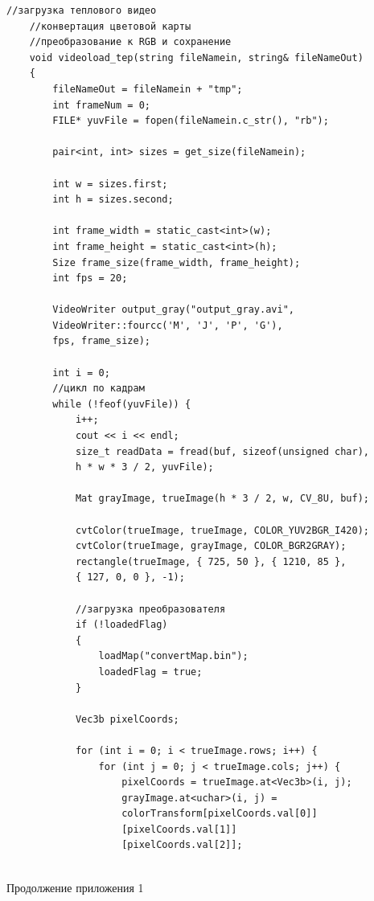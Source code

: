 \documentclass[14pt, a4paper]{extreport}
\begin{document}
\begin{Verbatim}[fontseries=c, fontsize=\fontsize{10pt}{12pt}\selectfont]
	//загрузка теплового видео
	//конвертация цветовой карты
	//преобразование к RGB и сохранение
	void videoload_tep(string fileNamein, string& fileNameOut)
	{
		fileNameOut = fileNamein + "tmp";
		int frameNum = 0;
		FILE* yuvFile = fopen(fileNamein.c_str(), "rb");
		
		pair<int, int> sizes = get_size(fileNamein);
		
		int w = sizes.first;
		int h = sizes.second;
		
		int frame_width = static_cast<int>(w);
		int frame_height = static_cast<int>(h);
		Size frame_size(frame_width, frame_height);
		int fps = 20;
		
		VideoWriter output_gray("output_gray.avi",
		VideoWriter::fourcc('M', 'J', 'P', 'G'),
		fps, frame_size);
		
		int i = 0;
		//цикл по кадрам
		while (!feof(yuvFile)) {
			i++;
			cout << i << endl;
			size_t readData = fread(buf, sizeof(unsigned char), 
			h * w * 3 / 2, yuvFile);
			
			Mat grayImage, trueImage(h * 3 / 2, w, CV_8U, buf);
			
			cvtColor(trueImage, trueImage, COLOR_YUV2BGR_I420);
			cvtColor(trueImage, grayImage, COLOR_BGR2GRAY);
			rectangle(trueImage, { 725, 50 }, { 1210, 85 },
			{ 127, 0, 0 }, -1);
			
			//загрузка преобразователя
			if (!loadedFlag)
			{
				loadMap("convertMap.bin");
				loadedFlag = true;
			}
			
			Vec3b pixelCoords;
			
			for (int i = 0; i < trueImage.rows; i++) {
				for (int j = 0; j < trueImage.cols; j++) {
					pixelCoords = trueImage.at<Vec3b>(i, j);
					grayImage.at<uchar>(i, j) =
					colorTransform[pixelCoords.val[0]]
					[pixelCoords.val[1]]
					[pixelCoords.val[2]];
		
\end{Verbatim}
\begin{flushright} \noindent Продолжение приложения 1 \end{flushright}
\end{document}
